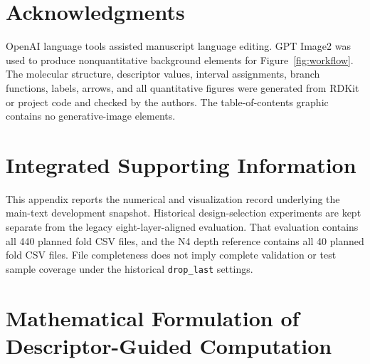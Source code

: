 \documentclass[journal=jcisd8,manuscript=article]{achemso}
\newif\ifdevelopmentdraft
\begin{document}
\section*{Acknowledgments}

OpenAI language tools assisted manuscript language editing. GPT Image2 was
used to produce nonquantitative background elements for Figure~\ref{fig:workflow}.
The molecular structure, descriptor values, interval assignments, branch
functions, labels, arrows, and all quantitative figures were generated from
RDKit or project code and checked by the authors. The table-of-contents graphic
contains no generative-image elements.

\ifdevelopmentdraft
\noindent\textit{Author input required before submission includes funding and
grant information, ORCID identifiers, the CRediT contribution statement, the
competing-interest statement, and public repository identifiers.}
\fi



\clearpage
\appendix
\setcounter{section}{0}
\setcounter{table}{0}
\setcounter{figure}{0}
\setcounter{equation}{0}
\renewcommand{\thesection}{S\arabic{section}}
\renewcommand{\thetable}{S\arabic{table}}
\renewcommand{\thefigure}{S\arabic{figure}}
\renewcommand{\theequation}{S\arabic{equation}}
\providecommand{\theHsection}{}
\providecommand{\theHtable}{}
\providecommand{\theHfigure}{}
\providecommand{\theHequation}{}
\renewcommand{\theHsection}{S.\arabic{section}}
\renewcommand{\theHtable}{S.\arabic{table}}
\renewcommand{\theHfigure}{S.\arabic{figure}}
\renewcommand{\theHequation}{S.\arabic{equation}}

\section*{Integrated Supporting Information}

This appendix reports the numerical and visualization record underlying the
main-text development snapshot. Historical design-selection experiments are
kept separate from the legacy eight-layer-aligned evaluation. That evaluation
contains all 440 planned fold CSV files, and the N4 depth reference contains
all 40 planned fold CSV files. File completeness does not imply complete
validation or test sample coverage under the historical \texttt{drop\_last}
settings.

\section{Mathematical Formulation of Descriptor-Guided Computation}
\label{sec:math-appendix}
\end{document}
